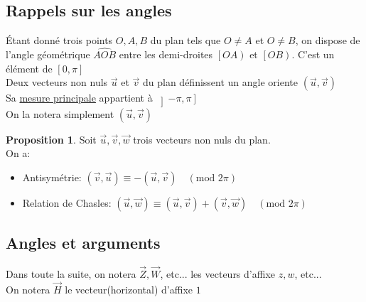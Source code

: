 \documentclass[10pt,a4paper]{article}
\theoremstyle{definition}
\newtheorem{proposition}{Proposition}[section]
\begin{document}
\subsection{Rappels sur les angles}
\noindent Étant donné trois points $O, A, B$ du plan tels que $O \neq A$ et $O \neq B$, on dispose de l'angle géométrique $\widehat{AOB}$ entre les demi-droites $\left[ OA \right)$ et $\left[ OB \right)$. C'est un élément de $[0, \pi]$ \\
Deux vecteurs non nuls $\vec{u}$ et $\vec{v}$ du plan définissent un angle oriente $(\vec{u}, \vec{v})$ \\
Sa \uline{mesure principale} appartient à $\left] -\pi, \pi \right]$ \\
On la notera simplement $(\vec{u}, \vec{v})$
\begin{proposition}
Soit $\vec{u}, \vec{v}, \vec{w}$ trois vecteurs non nuls du plan. \\
On a:
\begin{itemize}
\item Antisymétrie: $(\vec{v}, \vec{u}) \equiv -(\vec{u}, \vec{v}) \quad (\text{mod }2\pi)$
\item Relation de Chasles: $(\vec{u}, \vec{w}) \equiv (\vec{u}, \vec{v}) + (\vec{v}, \vec{w}) \quad (\text{mod }2\pi)$
\end{itemize}
\end{proposition}

\subsection{Angles et arguments}
\noindent Dans toute la suite, on notera $\vec{Z}, \vec{W}$, etc... les vecteurs d'affixe $z, w$, etc... \\
On notera $\vec{H}$ le vecteur(horizontal) d'affixe $1$ \medskip
\end{document}
